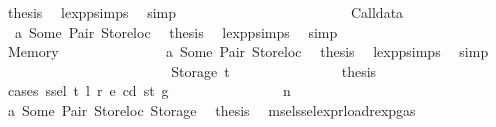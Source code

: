 \begin{isabellebody}
\ {\isacharquery}{\kern0pt}thesis\ \isamarkupfalse%
\ lexp{\isachardot}{\kern0pt}psimps{\isacharparenleft}{\kern0pt}{}{\isacharparenright}{\kern0pt}\ \isamarkupfalse%
\ simp\isanewline
\ \ \ \ \ \ \ \ \ \ \isamarkupfalse%
\isanewline
\ \ \ \ \ \ \ \ \ \ \ \ \isamarkupfalse%
\ {\isacharparenleft}{\kern0pt}Calldata\ {\isacharunderscore}{\kern0pt}{\isacharparenright}{\kern0pt}\isanewline
\ \ \ \ \ \ \ \ \ \ \ \ \isamarkupfalse%
\ \ a{}\ Some\ Pair\ Storeloc\ \isamarkupfalse%
\ {\isacharquery}{\kern0pt}thesis\ \isamarkupfalse%
\ lexp{\isachardot}{\kern0pt}psimps{\isacharparenleft}{\kern0pt}{}{\isacharparenright}{\kern0pt}\ \isamarkupfalse%
\ simp\isanewline
\ \ \ \ \ \ \ \ \ \ \isamarkupfalse%
\isanewline
\ \ \ \ \ \ \ \ \ \ \ \ \isamarkupfalse%
\ {\isacharparenleft}{\kern0pt}Memory\ {\isacharunderscore}{\kern0pt}{\isacharparenright}{\kern0pt}\isanewline
\ \ \ \ \ \ \ \ \ \ \ \ \isamarkupfalse%
\ a{}\ Some\ Pair\ Storeloc\ \isamarkupfalse%
\ {\isacharquery}{\kern0pt}thesis\ \isamarkupfalse%
\ lexp{\isachardot}{\kern0pt}psimps{\isacharparenleft}{\kern0pt}{}{\isacharparenright}{\kern0pt}\ \isamarkupfalse%
\ simp\isanewline
\ \ \ \ \ \ \ \ \ \ \isamarkupfalse%
\isanewline
\ \ \ \ \ \ \ \ \ \ \ \ \isamarkupfalse%
\ {\isacharparenleft}{\kern0pt}Storage\ t{\isacharparenright}{\kern0pt}\isanewline
\ \ \ \ \ \ \ \ \ \ \ \ \isamarkupfalse%
\ \isamarkupfalse%
\ {\isacharquery}{\kern0pt}thesis\isanewline
\ \ \ \ \ \ \ \ \ \ \ \ \isamarkupfalse%
\ {\isacharparenleft}{\kern0pt}cases\ {\isachardoublequoteopen}ssel\ t\ l\ r\ e\ cd\ st\ g{\isachardoublequoteclose}{\isacharparenright}{\kern0pt}\isanewline
\ \ \ \ \ \ \ \ \ \ \ \ \ \ \isamarkupfalse%
\ {\isacharparenleft}{\kern0pt}n\ {\isacharunderscore}{\kern0pt}\ {\isacharunderscore}{\kern0pt}{\isacharparenright}{\kern0pt}\isanewline
\ \ \ \ \ \ \ \ \ \ \ \ \ \ \isamarkupfalse%
\ a{}\ Some\ Pair\ Storeloc\ Storage\ \isamarkupfalse%
\ {\isacharquery}{\kern0pt}thesis\ \isamarkupfalse%
\ msel{\isacharunderscore}{\kern0pt}ssel{\isacharunderscore}{\kern0pt}expr{\isacharunderscore}{\kern0pt}load{\isacharunderscore}{\kern0pt}rexp{\isacharunderscore}{\kern0pt}gas{\isacharparenleft}{\kern0pt}{}{\isacharparenright}{\kern0pt}\ \isamarkupfalse%

\end{isabellebody}
